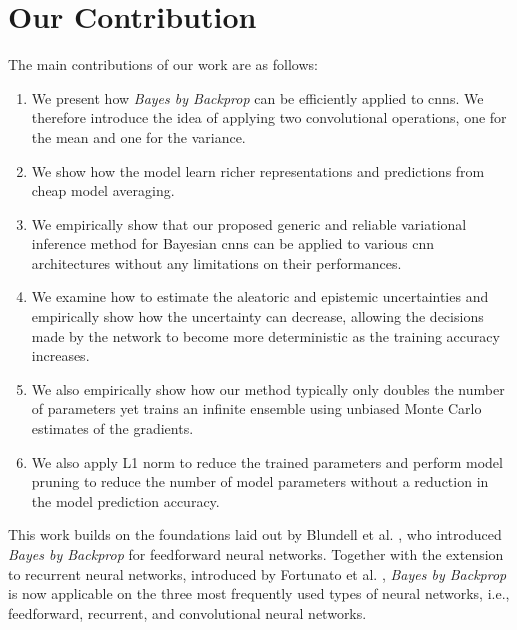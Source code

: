 \section{Our Contribution}
\newline The main contributions of our work are as follows: 
\begin{enumerate}
    \item We present how \textit{Bayes by Backprop} can be efficiently applied to \acp{cnn}. We therefore introduce the idea of applying two convolutional operations, one for the mean and one for the variance.
    \item We show how the model learn richer representations and predictions from cheap model averaging.
    \item We empirically show that our proposed generic and reliable variational inference method for Bayesian \acp{cnn} can be applied to various \ac{cnn} architectures without any limitations on their performances. 
    \item We examine how to estimate the aleatoric and epistemic uncertainties and empirically show how the uncertainty can decrease, allowing the decisions made by the network to become more deterministic as the training accuracy increases. 
    \item We also empirically show how our method typically only doubles the number of parameters yet trains an infinite ensemble using unbiased Monte Carlo estimates of the gradients. 
    \item We also apply L1 norm to reduce the trained parameters and perform model pruning to reduce the number of model parameters without a reduction in the model prediction accuracy. 
\end{enumerate} 
This work builds on the foundations laid out by Blundell et al. \cite{blundell2015weight}, who introduced \textit{Bayes by Backprop} for feedforward neural networks. Together with the extension to recurrent neural networks, introduced by Fortunato et al. \cite{fortunato2017bayesian}, \textit{Bayes by Backprop} is now applicable on the three most frequently used types of neural networks, i.e., feedforward, recurrent, and convolutional neural networks.


